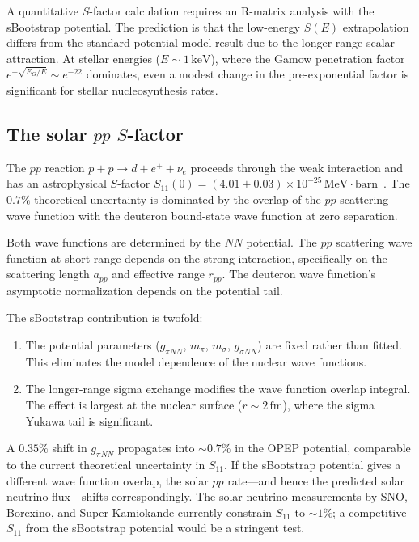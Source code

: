 \documentclass[12pt,a4paper]{article}
\newcommand{\MeV}{\,\text{MeV}}
\newcommand{\keV}{\,\text{keV}}
\begin{document}
A quantitative $S$-factor calculation requires an R-matrix analysis
with the sBootstrap potential.  The prediction is that the low-energy
$S(E)$ extrapolation differs from the standard potential-model result
due to the longer-range scalar attraction.  At stellar energies
($E \sim 1\keV$), where the Gamow penetration factor
$e^{-\sqrt{E_G/E}} \sim e^{-22}$ dominates, even a modest change
in the pre-exponential factor is significant for stellar
nucleosynthesis rates.

\subsection{The solar $pp$ $S$-factor}

The $pp$ reaction $p + p \to d + e^+ + \nu_e$ proceeds through the
weak interaction and has an astrophysical $S$-factor
$S_{11}(0) = (4.01 \pm 0.03) \times 10^{-25}\MeV\cdot\text{barn}$~\cite{AdelbergerSFactor2011}.
The $0.7\%$ theoretical uncertainty is dominated by the
overlap of the $pp$ scattering wave function with the deuteron
bound-state wave function at zero separation.

Both wave functions are determined by the $NN$ potential.  The $pp$
scattering wave function at short range depends on the strong
interaction, specifically on the scattering length $a_{pp}$ and
effective range $r_{pp}$.  The deuteron wave function's asymptotic
normalization depends on the potential tail.

The sBootstrap contribution is twofold:
\begin{enumerate}
\item The potential parameters ($g_{\pi NN}$, $m_\pi$, $m_\sigma$,
  $g_{\sigma NN}$) are fixed rather than fitted.  This eliminates
  the model dependence of the nuclear wave functions.
\item The longer-range sigma exchange modifies the wave function
  overlap integral.  The effect is largest at the nuclear surface
  ($r \sim 2\,\text{fm}$), where the sigma Yukawa tail is significant.
\end{enumerate}

A $0.35\%$ shift in $g_{\pi NN}$ propagates into $\sim 0.7\%$ in
the OPEP potential, comparable to the current theoretical uncertainty
in $S_{11}$.  If the sBootstrap potential gives a different wave
function overlap, the solar $pp$ rate---and hence the predicted
solar neutrino flux---shifts correspondingly.  The solar neutrino
measurements by SNO, Borexino, and Super-Kamiokande currently
constrain $S_{11}$ to $\sim 1\%$; a competitive $S_{11}$ from the
sBootstrap potential would be a stringent test.
\end{document}
